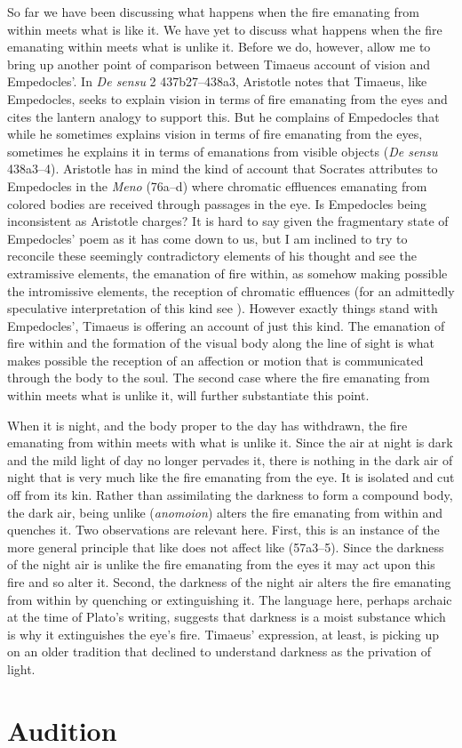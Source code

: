 So far we have been discussing what happens when the fire emanating from within meets what is like it. We have yet to discuss what happens when the fire emanating within meets what is unlike it. Before we do, however, allow me to bring up another point of comparison between Timaeus account of vision and Empedocles'. In \emph{De sensu} 2 437b27--438a3, Aristotle notes that Timaeus, like Empedocles, seeks to explain vision in terms of fire emanating from the eyes and cites the lantern analogy to support this. But he complains of Empedocles that while he sometimes explains vision in terms of fire emanating from the eyes, sometimes he explains it in terms of emanations from visible objects (\emph{De sensu} 438a3--4). Aristotle has in mind the kind of account that Socrates attributes to Empedocles in the \emph{Meno} (76a--d) where chromatic effluences emanating from colored bodies are received through passages in the eye. Is Empedocles being inconsistent as Aristotle charges? It is hard to say given the fragmentary state of Empedocles' poem as it has come down to us, but I am inclined to try to reconcile these seemingly contradictory elements of his thought and see the extramissive elements, the emanation of fire within, as somehow making possible the intromissive elements, the reception of chromatic effluences (for an admittedly speculative interpretation of this kind see \citealt[chapter 1.3]{Kalderon:2015fr}). However exactly things stand with Empedocles', Timaeus is offering an account of just this kind. The emanation of fire within and the formation of the visual body along the line of sight is what makes possible the reception of an affection or motion that is communicated through the body to the soul. The second case where the fire emanating from within meets what is unlike it, will further substantiate this point.

When it is night, and the body proper to the day has withdrawn, the fire emanating from within meets with what is unlike it. Since the air at night is dark and the mild light of day no longer pervades it, there is nothing in the dark air of night that is very much like the fire emanating from the eye. It is isolated and cut off from its kin. Rather than assimilating the darkness to form a compound body, the dark air, being unlike (\emph{anomoion}) alters the fire emanating from within and quenches it. Two observations are relevant here. First, this is an instance of the more general principle that like does not affect like (57a3--5). Since the darkness of the night air is unlike the fire emanating from the eyes it may act upon this fire and so alter it. Second, the darkness of the night air alters the fire emanating from within by quenching or extinguishing it. The language here, perhaps archaic at the time of Plato's writing, suggests that darkness is a moist substance which is why it extinguishes the eye's fire. Timaeus' expression, at least, is picking up on an older tradition that declined to understand darkness as the privation of light. 


\section{Audition} %
\label{sec:audition}




